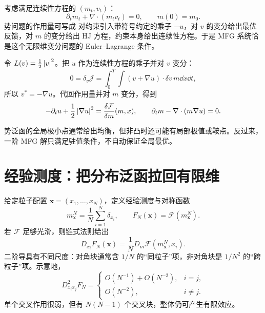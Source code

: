 考虑满足连续性方程的 $(m_t,v_t)$：
\[
\partial_tm_t+\nabla\cdot(m_tv_t)=0,
\qquad m(0)=m_0.
\]
势问题的作用量可写成
对约束引入带符号约定的乘子 $-u$，对 $v$ 的变分给出最优反馈，对 $m$ 的变分给出 HJ 方程，约束本身给出连续性方程。于是 MFG 系统恰是这个无限维变分问题的 Euler--Lagrange 条件。

\begin{derivation}[以二次动能为例]
令 $L(v)=\tfrac12\left\lvert v\right\rvert^2$。把 $u$ 作为连续性方程的乘子并对 $v$ 变分：
\[
0=\delta_v\mathcal J
=\int_0^T\int (v+\nabla u)\cdot\delta v\,m\dd x\dd t,
\]
所以 $v^*=-\nabla u$。代回作用量并对 $m$ 变分，得到
\[
-\partial_tu+\frac12\left\lvert\nabla u\right\rvert^2
=\frac{\delta\mathcal F}{\delta m}(m,x),
\qquad
\partial_tm-\nabla\cdot(m\nabla u)=0.
\]
\end{derivation}

\begin{pitfall}
势泛函的全局极小点通常给出均衡，但非凸时还可能有局部极值或鞍点。反过来，一阶 MFG 解只满足驻值条件，不自动保证全局最优。
\end{pitfall}

\section{经验测度：把分布泛函拉回有限维}

给定粒子配置 $\symbf{x}=(x_1,\ldots,x_N)$，定义经验测度与对称函数
\[
m_{\symbf{x}}^N=\frac1N\sum_{i=1}^N\delta_{x_i},
\qquad
F_N(\symbf{x})=\mathcal F(m_{\symbf{x}}^N).
\]
若 $\mathcal F$ 足够光滑，则链式法则给出
\[
D_{x_i}F_N(\symbf{x})=\frac1N
D_m\mathcal F(m_{\symbf{x}}^N,x_i).
\]
二阶导具有不同尺度：对角块通常含 $1/N$ 的“同粒子”项，非对角块是 $1/N^2$ 的“跨粒子”项。示意地，
\[
D_{x_ix_j}^2F_N=
\begin{cases}
O(N^{-1})+O(N^{-2}),&i=j,\\
O(N^{-2}),&i\ne j.
\end{cases}
\]
单个交叉作用很弱，但有 $N(N-1)$ 个交叉块，整体仍可产生有限效应。

\begin{center}
\end{center}

